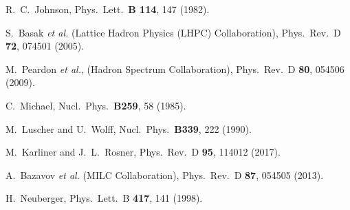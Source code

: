 \documentclass[showkeys,aps,twocolumn,showpacs,preprintnumbers,amsmath,amssymb,prd,letterpaper,floatfix,nofootinbib,superscriptaddress,]{revtex4-1}
\begin{document}
{\begin{thebibliography}{99}
  R.~C.~Johnson,
  Phys.\ Lett.\  {\bf B 114}, 147 (1982).

  S.~Basak {\it et al.} (Lattice Hadron Physics (LHPC) Collaboration),
  Phys.\ Rev.\ D {\bf 72}, 074501 (2005).


  M.~Peardon {\it et al.}, (Hadron Spectrum Collaboration),
  Phys.\ Rev.\ D {\bf 80}, 054506 (2009).


  C.~Michael,
  Nucl.\ Phys.\ {\bf B259}, 58 (1985).

  M.~Luscher and U.~Wolff,
  Nucl.\ Phys.\ {\bf B339}, 222 (1990).



  M.~Karliner and J.~L.~Rosner,
  Phys.\ Rev.\ D {\bf 95}, 114012 (2017).

  A.~Bazavov {\it et al.} (MILC Collaboration),
  Phys.\ Rev.\ D {\bf 87}, 054505 (2013).

  H.~Neuberger,
  Phys.\ Lett.\ B {\bf 417}, 141 (1998).


\end{thebibliography}}
\end{document}
